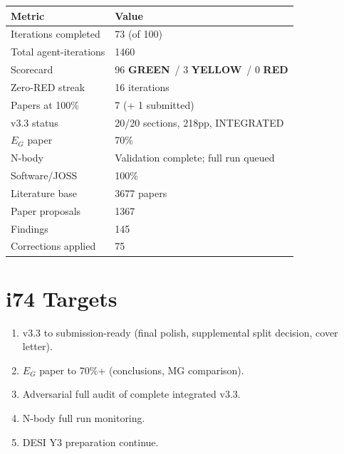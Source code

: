 \documentclass[11pt,a4paper]{article}
\newcommand{\GREEN}{\textcolor{dfdgreen}{\textbf{GREEN}}}
\newcommand{\YELLOW}{\textcolor{dfdyellow}{\textbf{YELLOW}}}
\newcommand{\RED}{\textcolor{dfdred}{\textbf{RED}}}
\begin{document}
\begin{center}
\begin{tabular}{ll}
\toprule
\textbf{Metric} & \textbf{Value} \\
\midrule
Iterations completed & 73 (of 100) \\
Total agent-iterations & 1460 \\
Scorecard & 96 \GREEN\ / 3 \YELLOW\ / 0 \RED \\
Zero-RED streak & 16 iterations \\
Papers at 100\% & 7 (+ 1 submitted) \\
v3.3 status & 20/20 sections, 218pp, INTEGRATED \\
$E_G$ paper & 70\% \\
N-body & Validation complete; full run queued \\
Software/JOSS & 100\% \\
Literature base & 3677 papers \\
Paper proposals & 1367 \\
Findings & 145 \\
Corrections applied & 75 \\
\bottomrule
\end{tabular}
\end{center}

\section{i74 Targets}

\begin{enumerate}[nosep]
\item v3.3 to submission-ready (final polish, supplemental split decision, cover letter).
\item $E_G$ paper to 70\%+ (conclusions, MG comparison).
\item Adversarial full audit of complete integrated v3.3.
\item N-body full run monitoring.
\item DESI Y3 preparation continue.
\end{enumerate}
\end{document}
